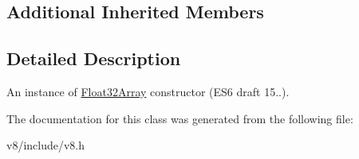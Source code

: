 \subsection*{Additional Inherited Members}


\subsection{Detailed Description}
An instance of \mbox{\hyperlink{classv8_1_1Float32Array}{Float32\+Array}} constructor (E\+S6 draft 15..). 

The documentation for this class was generated from the following file\+:\begin{DoxyCompactItemize}
\item 
v8/include/v8.\+h\end{DoxyCompactItemize}
